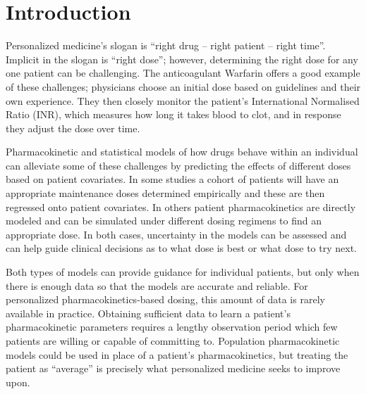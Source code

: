 \newpage


\section{Introduction}

Personalized medicine’s slogan is ``right drug -- right patient -- right time''.  Implicit in the slogan is ``right dose''; however, determining the right dose for any one patient can be challenging. The anticoagulant Warfarin offers a good example of these challenges; physicians choose an initial dose based on guidelines and their own experience. They then closely monitor the patient’s International Normalised Ratio (INR), which measures how long it takes blood to clot, and in response they adjust the dose over time.

Pharmacokinetic and statistical models of how drugs behave within an individual can alleviate some of these challenges by predicting the effects of different doses based on patient covariates. In some studies \cite{schwarz2008genetic,Sohrabi2017-zv, Caldwell2007-mi}  a cohort of patients will have an appropriate maintenance doses determined empirically and these are then regressed onto patient covariates.  In others \cite{ohara2019differences,Zhu2017-rk, Xue2017-mp}  patient pharmacokinetics are directly modeled and can be simulated under different dosing regimens to find an appropriate dose.  In both cases, uncertainty in the models can be assessed and can help guide clinical decisions as to what dose is best or what dose to try next.

Both types of  models can provide guidance for individual patients, but only when there is enough data so that the models are accurate and reliable. For personalized pharmacokinetics-based dosing, this amount of data is rarely available in practice.  Obtaining sufficient data to learn a patient’s pharmacokinetic parameters requires a lengthy observation period which few patients are willing or capable of committing to. Population pharmacokinetic models could be used in place of a patient’s pharmacokinetics, but treating the patient as “average” is precisely what personalized medicine seeks to improve upon.

